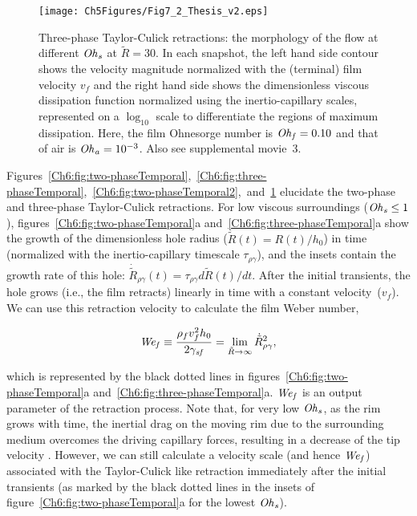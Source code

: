 \begin{figure}
	\centering
	\texttt{[image: Ch5Figures/Fig7\_2\_Thesis\_v2.eps]}	
	\caption{Three-phase Taylor-Culick retractions: the morphology of the flow at different $\mathit{Oh}_\mathit{s}$ at $\tilde{R} = 30$. In each snapshot, the left hand side contour shows the velocity magnitude normalized with the (terminal) film velocity $v_f$ and the right hand side shows the dimensionless viscous dissipation function normalized using the inertio-capillary scales, represented on a $\log_{\text{10}}$ scale to differentiate the regions of maximum dissipation. Here, the film Ohnesorge number is $\mathit{Oh}_\mathit{f} = 0.10$ and that of air is $\mathit{Oh}_\mathit{a} = 10^{-3}$. Also see supplemental movie~{\color{Myfig}3}.}
	\label{Ch6:fig:three-phaseTemporal2}
\end{figure}

Figures~\ref{Ch6:fig:two-phaseTemporal},~\ref{Ch6:fig:three-phaseTemporal},~\ref{Ch6:fig:two-phaseTemporal2},~and~\ref{Ch6:fig:three-phaseTemporal2} elucidate the two-phase and three-phase Taylor-Culick retractions. For low viscous surroundings ($\mathit{Oh}_\mathit{s} \le 1$), figures~\ref{Ch6:fig:two-phaseTemporal}a and~\ref{Ch6:fig:three-phaseTemporal}a show the growth of the dimensionless hole radius ($\tilde{R}(t) = R(t)/h_0$) in time (normalized with the inertio-capillary timescale $\tau_{\rho\gamma}$), and the insets contain the growth rate of this hole: $\dot{\tilde{R}}_{\rho\gamma} (t) = \tau_{\rho\gamma} d\tilde{R}(t)/dt$. After the initial transients, the hole grows (i.e., the film retracts) linearly in time with a constant velocity~($v_f$). We can use this retraction velocity to calculate the film Weber number, 

\begin{align}
	\label{Eqn::Weber definition}
	\mathit{We}_\mathit{f} \equiv \frac{\rho_fv_f^2h_0}{2\gamma_\mathit{sf}} = \lim\limits_{\tilde{R} \to \infty}\dot{\tilde{R}}_{\rho\gamma}^2,
\end{align}

\noindent which is represented by the black dotted lines in figures~\ref{Ch6:fig:two-phaseTemporal}a and~\ref{Ch6:fig:three-phaseTemporal}a. $\mathit{We}_\mathit{f}$ is an output parameter of the retraction process. Note that, for very low $\mathit{Oh}_\mathit{s}$, as the rim grows with time, the inertial drag on the moving rim due to the surrounding medium overcomes the driving capillary forces, resulting in a decrease of the tip velocity \citep[see insets of figure~\ref{Ch6:fig:two-phaseTemporal}a and][]{jian_deng_thoraval_2020}. However, we can still calculate a velocity scale (and hence $\mathit{We}_\mathit{f}$) associated with the Taylor-Culick like retraction immediately after the initial transients (as marked by the black dotted lines in the insets of figure~\ref{Ch6:fig:two-phaseTemporal}a for the lowest $\mathit{Oh}_\mathit{s}$). 

